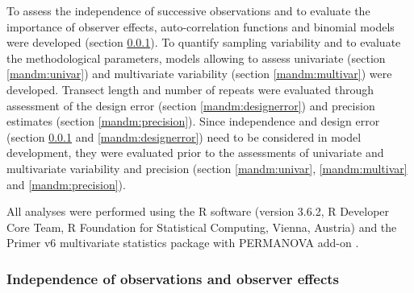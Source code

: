 \documentclass[10pt,letterpaper]{article}
\begin{document}
To assess the independence of successive observations and to evaluate the importance of observer effects, auto-correlation functions and binomial models were developed (section \ref{mandm:indep}). To quantify sampling variability and to evaluate the methodological parameters, models allowing to assess univariate (section \ref{mandm:univar}) and multivariate variability (section \ref{mandm:multivar}) were developed. Transect length and number of repeats were evaluated through assessment of the design error (section \ref{mandm:designerror}) and precision estimates (section \ref{mandm:precision}). Since independence and design error (section \ref{mandm:indep} and \ref{mandm:designerror}) need to be considered in model development, they were evaluated prior to the assessments of univariate and multivariate variability and precision (section \ref{mandm:univar}, \ref{mandm:multivar} and \ref{mandm:precision}). 

All analyses were performed using the R software (version 3.6.2, R Developer Core Team, R Foundation for Statistical Computing, Vienna, Austria) and the Primer v6 multivariate statistics package \cite{Clarke2006} with PERMANOVA add-on \cite{Anderson2008}.

\subsubsection{Independence of observations and observer effects}
\label{mandm:indep}
\end{document}
